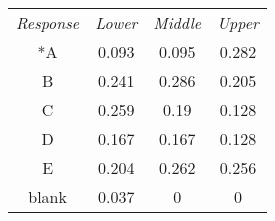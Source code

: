 \begin{table}[!htbp]
\begin{subtable}[!htbp]{0.5\textwidth}
{\begin{tabular}[!htbp]{c c c c}
\midrule
\textit{Response} & \textit{Lower} & \textit{Middle} & \textit{Upper} \\
*A & 0.093 & 0.095 & 0.282 \\
B & 0.241 & 0.286 & 0.205 \\
C & 0.259 & 0.19 & 0.128 \\
D & 0.167 & 0.167 & 0.128 \\
E & 0.204 & 0.262 & 0.256 \\
blank & 0.037 & 0 & 0 \\
\bottomrule
\end{tabular}
}
\label{tab:table1_f}
\end{subtable}
\label{tab:table_distract}
\end{table}
\fi